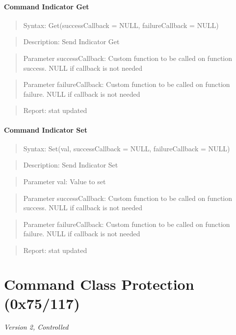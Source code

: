 \paragraph{Command Indicator Get}
\begin{quote}Syntax: Get(successCallback = NULL, failureCallback = NULL)\end{quote}
\begin{quote}Description: Send Indicator Get\end{quote}
\begin{quote}Parameter successCallback: Custom function to be called on function success. NULL if callback is not needed\end{quote}
\begin{quote}Parameter failureCallback: Custom function to be called on function failure. NULL if callback is not needed\end{quote}
\begin{quote}Report: stat updated\end{quote}

\paragraph{Command Indicator Set}
\begin{quote}Syntax: Set(val, successCallback = NULL, failureCallback = NULL)\end{quote}
\begin{quote}Description: Send Indicator Set\end{quote}
\begin{quote}Parameter val: Value to set\end{quote}
\begin{quote}Parameter successCallback: Custom function to be called on function success. NULL if callback is not needed\end{quote}
\begin{quote}Parameter failureCallback: Custom function to be called on function failure. NULL if callback is not needed\end{quote}
\begin{quote}Report: stat updated\end{quote}


\section{Command Class Protection (0x75/117)}

\textit{Version 2, Controlled}
\newline

